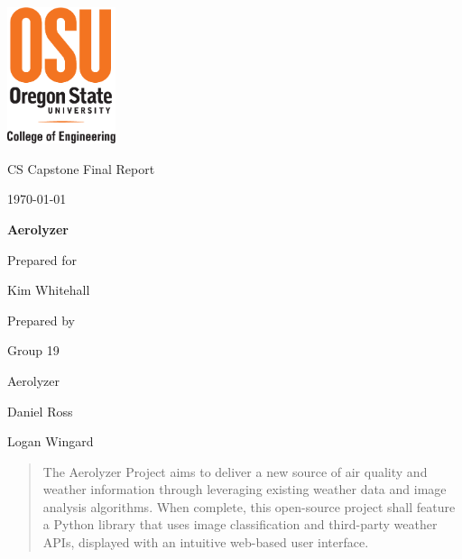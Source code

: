 \documentclass[onecolumn, draftclsnofoot,10pt, compsoc]{IEEEtran}
\def \CapstoneTeamName{		Aerolyzer}
\def \CapstoneTeamNumber{		19}
\def \GroupMemberOne{			Daniel Ross}
\def \GroupMemberTwo{			Logan Wingard}
\def \CapstoneProjectName{		Aerolyzer}
\def \CapstoneSponsorPerson{		Kim Whitehall}
\def \DocType{		%
	Final Report
}
\newcommand{\NameSigPair}[1]{\par
	\makebox[2.75in][r]{#1} \hfil 	\makebox[3.25in]{\makebox[2.25in]{\hrulefill} \hfill		\makebox[.75in]{\hrulefill}}
	\par\vspace{-12pt} \textit{\tiny\noindent
		\makebox[2.75in]{} \hfil		\makebox[3.25in]{\makebox[2.25in][r]{Signature} \hfill	\makebox[.75in][r]{Date}}}}
\renewcommand{\NameSigPair}[1]{#1}
\begin{document}
	\begin{titlepage}
		\begin{singlespace}
			\centering
			\includegraphics[height=4cm,natwidth=345,natheight=435]{images/coe_v_spot1.png}
			\hfill 
			\par\vspace{.2in}
			\centering
			\scshape{
				\huge CS Capstone \DocType \par
				{\large\today}\par
				\vspace{.5in}
				\textbf{\Huge\CapstoneProjectName}\par
				\vfill
				{\large Prepared for}\par
				{\Large\NameSigPair{\CapstoneSponsorPerson}\par}
				{\large Prepared by }\par
				Group\CapstoneTeamNumber\par
				\CapstoneTeamName\par 
				\vspace{5pt}
				{\large
					\NameSigPair{\GroupMemberOne}\par
					\NameSigPair{\GroupMemberTwo}\par
				}
				\vspace{20pt}
			}
			\begin{abstract}  
				The Aerolyzer Project aims to deliver a new source of air quality and weather information through leveraging existing weather data and image analysis algorithms.
				When complete, this open-source project shall feature a Python library that uses image classification and third-party weather APIs, displayed with an intuitive web-based user interface.
			\end{abstract}     
		\end{singlespace}
	\end{titlepage}
\end{document}
